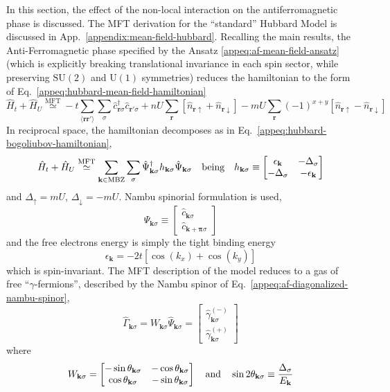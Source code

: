 In this section, the effect of the non-local interaction on the antiferromagnetic phase is discussed. The MFT derivation for the ``standard'' Hubbard Model is discussed in App.~\ref{appendix:mean-field-hubbard}. Recalling the main results, the Anti-Ferromagnetic phase specified by the Ansatz \eqref{appeq:af-mean-field-ansatz} (which is explicitly breaking translational invariance in each spin sector, while preserving $\mathrm{SU}(2)$ and $\mathrm{U}(1)$ symmetries) reduces the hamiltonian to the form of Eq.~\eqref{appeq:hubbard-mean-field-hamiltonian}
\[
	\hat H_t + \hat H_U \stackrel{\mathrm{MFT}}{\simeq} -t \sum_{\langle \mathbf{r}\mathbf{r}' \rangle} \sum_\sigma \hat c_{\mathbf{r}\sigma}^\dagger \hat c_{\mathbf{r}'\sigma}
	+ nU \sum_\mathbf{r} \left[
	\hat n_{\mathbf{r}\uparrow} + \hat n_{\mathbf{r}\downarrow}
	\right] - mU \sum_\mathbf{r} (-1)^{x+y} \left[
	\hat n_{\mathbf{r}\uparrow} - \hat n_{\mathbf{r}\downarrow}
	\right]
\]
In reciprocal space, the hamiltonian decomposes as in Eq.~\eqref{appeq:hubbard-bogoliubov-hamiltonian},
\[
	\hat H_t + \hat H_U \stackrel{\mathrm{MFT}}{\simeq} \sum_{\mathbf{k} \in \mathrm{MBZ}} \sum_\sigma \hat \Psi_{\mathbf{k}\sigma}^\dagger h_{\mathbf{k}\sigma} \hat \Psi_{\mathbf{k}\sigma}
	\qq{being}
	h_{\mathbf{k}\sigma} \equiv \begin{bmatrix}
		\epsilon_\mathbf{k} & -\Delta_\sigma \\
		-\Delta_\sigma & - \epsilon_\mathbf{k}
	\end{bmatrix}
\]
and $\Delta_\uparrow = mU$, $\Delta_\downarrow = -mU$. Nambu spinorial formulation is used,
\[
	\hat \Psi_{\mathbf{k}\sigma} \equiv \begin{bmatrix}
		\hat c_{\mathbf{k}\sigma} \\
		\hat c_{\mathbf{k}+\bm{\pi}\sigma} 
	\end{bmatrix}
\]
and the free electrons energy is simply the tight binding energy
\[
	\epsilon_\mathbf{k} = -2t \left[
		\cos (k_x) + \cos (k_y)
	\right]
\]
which is spin-invariant. The MFT description of the model reduces to a gas of free ``$\gamma$-fermions'', described by the Nambu spinor of Eq.~\eqref{appeq:af-diagonalized-nambu-spinor},
\[
	\hat\Gamma_{\mathbf{k}\sigma} = W_{\mathbf{k}\sigma} \hat \Psi_{\mathbf{k}\sigma} = \begin{bmatrix}
		\hat \gamma_{\mathbf{k}\sigma}^{(-)} \\ \hat \gamma_{\mathbf{k}\sigma}^{(+)}
	\end{bmatrix}
\]
where
\[
	W_{\mathbf{k}\sigma} = \begin{bmatrix}
		- \sin \theta_{\mathbf{k}\sigma} & - \cos \theta_{\mathbf{k}\sigma} \\ 
		\cos \theta_{\mathbf{k}\sigma} & - \sin \theta_{\mathbf{k}\sigma}
	\end{bmatrix}
	\qq{and}
	\sin 2\theta_{\mathbf{k}\sigma} \equiv \frac{\Delta_\sigma}{E_\mathbf{k}}
\]
